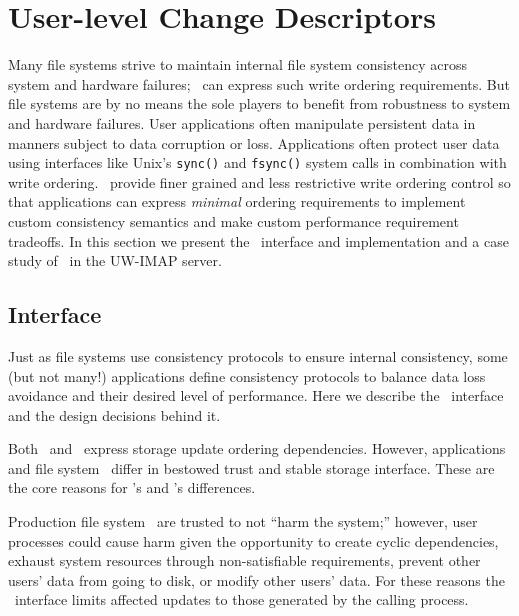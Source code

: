 \section{User-level Change Descriptors}
\label{sec:opgroup}

\newcommand{\opgroupCreate}{\texttt{opgroup\_create()}}
\newcommand{\opgroupSync}{\texttt{opgroup\_sync()}}
\newcommand{\opgroupAddDepend}{\texttt{opgroup\_add\_depend()}}
\newcommand{\opgroupEngage}{\texttt{opgroup\_engage()}}
\newcommand{\opgroupDisengage}{\texttt{opgroup\_disengage()}}
\newcommand{\opgroupRelease}{\texttt{opgroup\_release()}}
\newcommand{\opgroupAbandon}{\texttt{opgroup\_abandon()}}

Many file systems strive to maintain internal file system consistency
across system and hardware failures; \chdescs\ can express such write
ordering requirements. But file systems are by no means the sole
players to benefit from robustness to system and hardware failures.
User applications often manipulate persistent data in manners subject
to data corruption or loss. Applications often protect user data using
interfaces like Unix's \texttt{sync()} and \texttt{fsync()} system
calls in combination with write ordering. \Opgroups\ provide finer
grained and less restrictive write ordering control so that
applications can express \textit{minimal} ordering requirements to
implement custom consistency semantics and make custom performance
requirement tradeoffs. In this section we present the \opgroup\
interface and implementation and a case study of \opgroups\ in the
UW-IMAP server.

\subsection{Interface}
\label{sec:opgroup:interface}
Just as file systems use consistency protocols to ensure internal
consistency, some (but not many!) applications define consistency
protocols to balance data loss avoidance and their desired level of
performance. Here we describe the \opgroup\ interface and the design
decisions behind it.

Both \opgroups\ and \chdescs\ express storage update ordering
dependencies. However, applications and file system \modules\ differ
in bestowed trust and stable storage interface. These are the core
reasons for \opgroup{}'s and \chdesc{}'s differences.

Production file system \modules\ are trusted to not ``harm the
system;'' however, user processes could cause harm given the
opportunity to create cyclic dependencies, exhaust system resources
through non-satisfiable requirements, prevent other users' data from
going to disk, or modify other users' data. For these reasons the
\opgroup\ interface limits affected updates to those generated by the
calling process.

